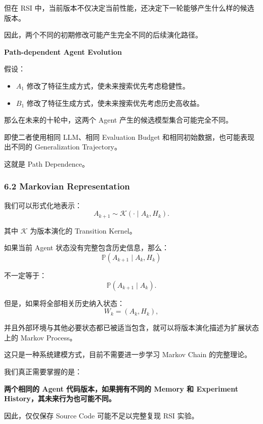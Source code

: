 但在 RSI 中，当前版本不仅决定当前性能，还决定下一轮能够产生什么样的候选版本。

因此，两个不同的初期修改可能产生完全不同的后续演化路径。

\textbf{Path-dependent Agent Evolution}


假设：

\begin{itemize}
\tightlist
\item
  \(A_1\) 修改了特征生成方式，使未来搜索优先考虑稳健性。
\item
  \(B_1\) 修改了特征生成方式，使未来搜索优先考虑历史高收益。
\end{itemize}

那么在未来的十轮中，这两个 Agent 产生的候选模型集合可能完全不同。

即使二者使用相同 LLM、相同 Evaluation Budget 和相同初始数据，也可能表现出不同的 Generalization Trajectory。

这就是 Path Dependence。

\hypertarget{part-3-37-0001-markovian-representation}{%
\subsubsection{6.2 Markovian Representation}\label{part-3-37-0001-markovian-representation}}

我们可以形式化地表示：
\[A_{k+1}
\sim
\mathcal K(\cdot\mid A_k,H_k).\]

其中 \(\mathcal K\) 为版本演化的 Transition Kernel。

如果当前 Agent 状态没有完整包含历史信息，那么：
\[\mathbb P(A_{k+1}\mid A_k,H_k)\]

不一定等于：
\[\mathbb P(A_{k+1}\mid A_k).\]

但是，如果将全部相关历史纳入状态：
\[W_k=(A_k,H_k),\]

并且外部环境与其他必要状态都已被适当包含，就可以将版本演化描述为扩展状态上的 Markov Process。

这只是一种系统建模方式，目前不需要进一步学习 Markov Chain 的完整理论。

我们真正需要掌握的是：

\textbf{两个相同的 Agent 代码版本，如果拥有不同的 Memory 和 Experiment History，其未来行为也可能不同。}

因此，仅仅保存 Source Code 可能不足以完整复现 RSI 实验。

